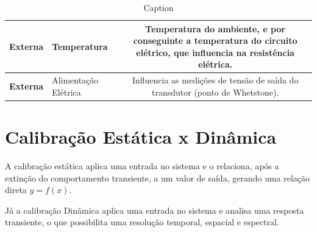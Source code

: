 \documentclass{article}
\begin{document}
\begin{table}[h]
\begin{tabular}{|l|l|c|}
             \textbf{Externa} & Temperatura & 
             \begin{minipage}{.4\textwidth}
                 \vspace{5px}
                 Temperatura do ambiente, e por conseguinte a temperatura do circuito elétrico, que influencia na resistência elétrica. 
                 \vspace{5px}
             \end{minipage}\\ \hline

             \textbf{Externa} & Alimentação Elétrica & 
             \begin{minipage}{.4\textwidth}
                 \vspace{5px}
                 Influencia as medições de tensão de saída do transdutor (ponto de Whetstone).
                 \vspace{5px}
             \end{minipage}\\ \hline

             
        \end{tabular}
        \caption{Caption}
        \label{tab:my_label}
    \end{table}

\section*{Calibração Estática x Dinâmica}
    A calibração estática aplica uma entrada no sistema e o relaciona, após a extinção do comportamento transiente, a um valor de saída, gerando uma relação direta $y=f(x)$.
    
    Já a calibração Dinâmica aplica uma entrada no sistema e analisa uma resposta transiente, o que possibilita uma resolução temporal, espacial e espectral.

\newpage
\end{document}
